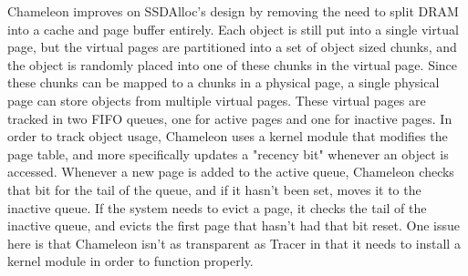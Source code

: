 Chameleon improves on SSDAlloc's design by removing the need to split DRAM into a cache and page buffer entirely. Each object is still put into a single virtual page, but the virtual pages are partitioned into a set of object sized chunks, and the object is randomly placed into one of these chunks in the virtual page. Since these chunks can be mapped to a chunks in a physical page, a single physical page can store objects from multiple virtual pages. These virtual pages are tracked in two FIFO queues, one for active pages and one for inactive pages. In order to track object usage, Chameleon uses a kernel module that modifies the page table, and more specifically updates a "recency bit" whenever an object is accessed. Whenever a new page is added to the active queue, Chameleon checks that bit for the tail of the queue, and if it hasn't been set, moves it to the inactive queue. If the system needs to evict a page, it checks the tail of the inactive queue, and evicts the first page that hasn't had that bit reset. One issue here is that Chameleon isn't as transparent as Tracer in that it needs to install a kernel module in order to function properly.


